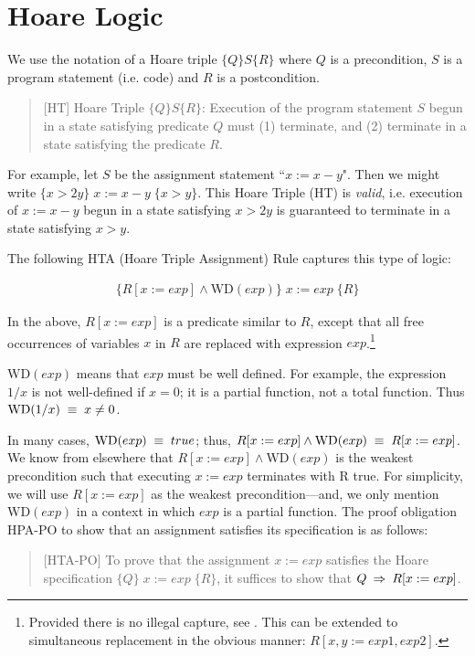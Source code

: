 \documentclass[runningheads,12pt]{article}
\def\WD{\textrm{WD}}
\begin{document}

\section{Hoare Logic}

 We use the notation of a Hoare triple $\{Q\} S \{R\}$ where $Q$ is a precondition, $S$ is a program statement (i.e. code) and $R$ is a postcondition. 

\begin{quote}
[HT] Hoare Triple $\{Q\} S \{R\}$: Execution of the program statement $S$ begun in a state satisfying predicate $Q$ must (1) terminate, and (2) terminate in a state satisfying the predicate $R$. 	
\end{quote}

For example, let $S$ be the assignment statement ``$x := x - y$". Then we might write $\{x > 2y\}\; x := x - y \;\{x > y\}$. This Hoare Triple (HT) is \textit{valid}, i.e. execution of $x := x - y$ begun in a state satisfying $x > 2y$ is guaranteed to terminate in a state satisfying $x > y$.

The following HTA (Hoare Triple Assignment) Rule captures this type of logic:

\begin{gather}
\{R[x := exp] \land \WD(exp)\}\; x := exp \;\{R\} \tag{HTA}
\end{gather}

\noindent In the above, $R[x := exp]$ is a predicate similar to $R$, except that all free occurrences of variables $x$ in $R$ are replaced with expression $exp$.\footnote{Provided there is no illegal capture, see \cite{Tourlakis2008}. This can be extended to simultaneous replacement in the obvious manner: $R[x, y := exp1, exp2]$.} 

$\WD(exp)$ means that $exp$ must be well defined. For example, the expression $1/x$ is not well-defined if $x=0$; it is a partial function, not a total function. Thus $\WD(1/x) \1\equiv x \neq 0$.

In many cases, $\WD(exp) \1\equiv true$; thus, $R[x := exp] \land \WD(exp) \1\equiv  R[x := exp]$. We know from elsewhere that $R[x := exp] \land \WD(exp)$ is the weakest precondition such that executing $x := exp$ terminates with R true. For simplicity, we will use $R[x := exp]$ as the weakest precondition---and, we only mention $\WD(exp)$ in a context in which $exp$ is a partial function. The proof obligation HPA-PO to show that an assignment satisfies its specification is as follows:
\begin{quote}
[HTA-PO] To prove that the assignment $x := exp$ satisfies the Hoare specification $\{Q\}\; x := exp \;\{R\}$, it suffices to show that $Q \; \mathbin\Rightarrow \; R[x :=exp]$. 
\end{quote}
\end{document}
